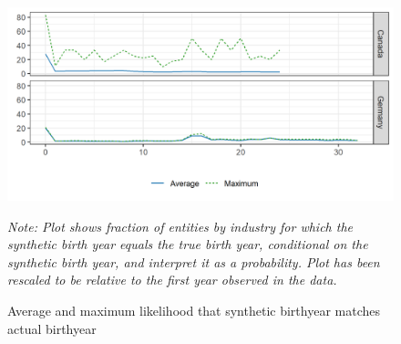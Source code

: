 \begin{figure}[ht]
\includegraphics[width=\linewidth]{r-graphs/fig_conf_both.png}
\caption{Average and maximum likelihood that synthetic birthyear matches actual birthyear\label{fig:Conf.Both}}

\begin{center}
\begin{minipage}{0.8\linewidth}
	\footnotesize \it
Note: Plot shows fraction of entities by industry for which the synthetic birth year equals the true birth year, conditional on the synthetic birth year, and interpret it as a probability. Plot has been rescaled to be relative to the first year observed in the data.	
\end{minipage}
\end{center}
\end{figure}